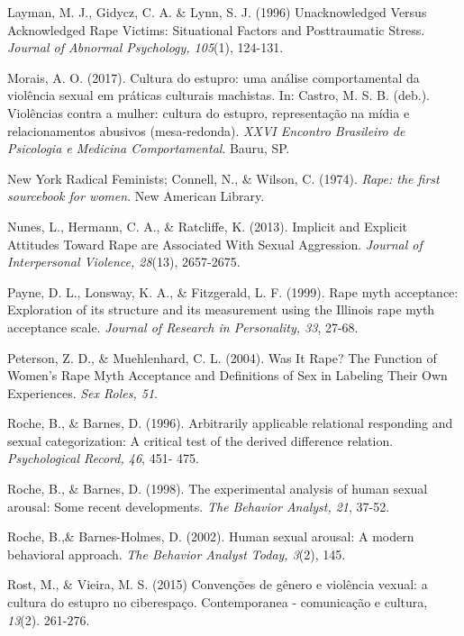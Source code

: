 \hangindent=25pt
\noindent Layman, M. J., Gidycz, C. A. \& Lynn, S. J. (1996) Unacknowledged Versus Acknowledged Rape Victims: Situational Factors and Posttraumatic Stress. \textit{Journal of Abnormal Psychology, 105}(1), 124-131.

\hangindent=25pt
\noindent Morais, A. O. (2017). Cultura do estupro: uma análise comportamental da violência sexual em práticas culturais machistas. In: Castro, M. S. B. (deb.). Violências contra a mulher: cultura do estupro, representação na mídia e relacionamentos abusivos (mesa-redonda). \textit{XXVI Encontro Brasileiro de Psicologia e Medicina Comportamental}. Bauru, SP.

\hangindent=25pt
\noindent New York Radical Feminists; Connell, N., \& Wilson, C. (1974). \textit{Rape: the first sourcebook for women}. New American Library. 

\hangindent=25pt
\noindent Nunes, L., Hermann, C. A., \& Ratcliffe, K. (2013). Implicit and Explicit Attitudes Toward Rape are Associated With Sexual Aggression. \textit{Journal of Interpersonal Violence, 28}(13), 2657-2675.

\hangindent=25pt
\noindent Payne, D. L., Lonsway, K. A., \& Fitzgerald, L. F. (1999). Rape myth acceptance: Exploration of its structure and its measurement using the Illinois rape myth acceptance scale. \textit{Journal of Research in Personality, 33}, 27-68.

\hangindent=25pt
\noindent Peterson, Z. D., \& Muehlenhard, C. L. (2004). Was It Rape? The Function of Women’s Rape Myth Acceptance and Definitions of Sex in Labeling Their Own Experiences. \textit{Sex Roles, 51}.

\hangindent=25pt
\noindent Roche, B., \& Barnes, D. (1996). Arbitrarily applicable relational responding and sexual categorization: A critical test of the derived difference relation. \textit{Psychological Record, 46}, 451- 475.

\hangindent=25pt
\noindent Roche, B., \& Barnes, D. (1998). The experimental analysis of human sexual arousal: Some recent developments. \textit{The Behavior Analyst, 21}, 37-52.

\hangindent=25pt
\noindent Roche, B.,\& Barnes-Holmes, D. (2002). Human sexual arousal: A modern behavioral approach. \textit{The Behavior Analyst Today, 3}(2), 145.

\hangindent=25pt
\noindent Rost, M., \& Vieira, M. S. (2015) Convenções de gênero e violência vexual: a cultura do estupro no ciberespaço. Contemporanea - comunicação e cultura, \textit{13}(2). 261-276.

